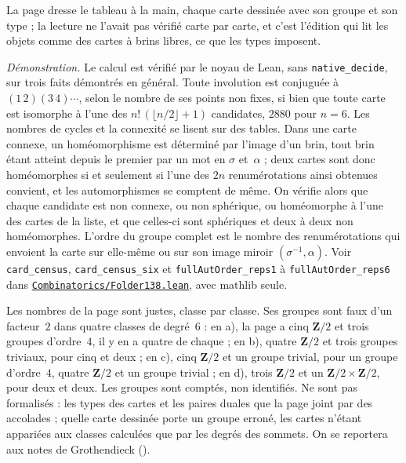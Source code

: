 {\small La page dresse le tableau à la main, chaque carte dessinée avec son groupe et son type ; la lecture ne l'avait pas vérifié carte par carte, et c'est l'édition qui lit les objets comme des cartes à brins libres, ce que les types imposent.

\emph{Démonstration.} Le calcul est vérifié par le noyau de Lean, sans \texttt{native\_decide}, sur trois faits démontrés en général. Toute involution est conjuguée à $(1\,2)(3\,4)\cdots$, selon le nombre de ses points non fixes, si bien que toute carte est isomorphe à l'une des $n!\,(\lfloor n/2 \rfloor + 1)$ candidates, $2880$ pour $n = 6$. Les nombres de cycles et la connexité se lisent sur des tables. Dans une carte connexe, un homéomorphisme est déterminé par l'image d'un brin, tout brin étant atteint depuis le premier par un mot en $\sigma$ et~$\alpha$ ; deux cartes sont donc homéomorphes si et seulement si l'une des $2n$ renumérotations ainsi obtenues convient, et les automorphismes se comptent de même. On vérifie alors que chaque candidate est non connexe, ou non sphérique, ou homéomorphe à l'une des cartes de la liste, et que celles-ci sont sphériques et deux à deux non homéomorphes. L'ordre du groupe complet est le nombre des renumérotations qui envoient la carte sur elle-même ou sur son image miroir $(\sigma^{-1}, \alpha)$. Voir \texttt{card\_census}, \texttt{card\_census\_six} et \texttt{fullAutOrder\_reps1} à \texttt{fullAutOrder\_reps6} dans \href{\leanblobmain/Combinatorics/Folder138.lean}{\texttt{Combinatorics/\allowbreak{}Folder138.\allowbreak{}lean}}, avec mathlib seule.

Les nombres de la page sont justes, classe par classe. Ses groupes sont faux d'un facteur~$2$ dans quatre classes de degré~$6$ : en a), la page a cinq $\mathbf Z/2$ et trois groupes d'ordre~$4$, il y en a quatre de chaque ; en b), quatre $\mathbf Z/2$ et trois groupes triviaux, pour cinq et deux ; en c), cinq $\mathbf Z/2$ et un groupe trivial, pour un groupe d'ordre~$4$, quatre $\mathbf Z/2$ et un groupe trivial ; en d), trois $\mathbf Z/2$ et un $\mathbf Z/2 \times \mathbf Z/2$, pour deux et deux. Les groupes sont comptés, non identifiés. Ne sont pas formalisés : les types des cartes et les paires duales que la page joint par des accolades ; quelle carte dessinée porte un groupe erroné, les cartes n'étant appariées aux classes calculées que par les degrés des sommets. On se reportera aux notes de Grothendieck ().\par}

